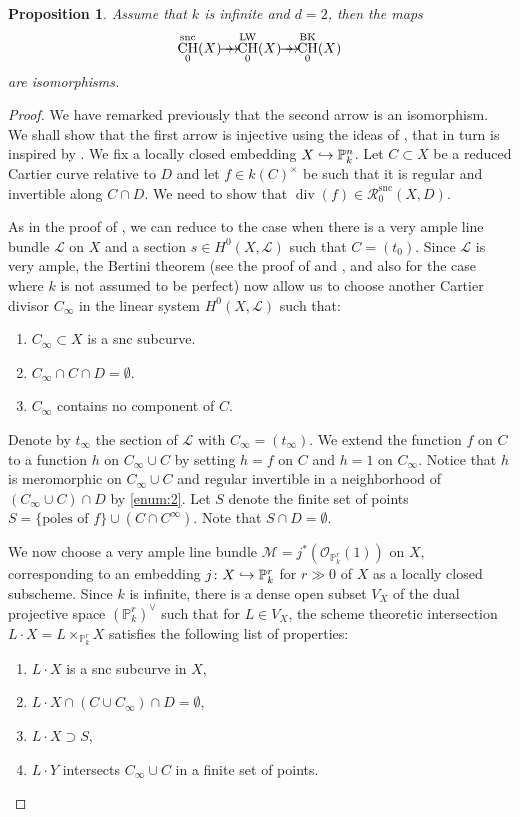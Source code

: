 \documentclass[JEP,XML,SOM,Unicode,published]{cedram}
\let\mathcal\mathscr
\def\hto{\mathrel{\lhook\joinrel\to}}
\newcommand{\onto}{\mathchoice{\to\hspace*{-5mm}\to}{\hspace*{-.5mm}\to\hspace*{-2.85mm}\to\hspace*{-.5mm}}{\to\hspace*{-3mm}\to}{\to\hspace*{-3mm}\to}}
\let\surj\onto
\let\inj\hto
\newcommand{\snc}{\mathrm{snc}}
\newcommand{\BK}{\mathrm{BK}}
\newcommand{\LW}{\mathrm{LW}}
\newtheorem{prop}[thm]{Proposition}
\theoremstyle{definition}
\newcommand{\sL}{{\mathcal L}}
\newcommand{\sM}{{\mathcal M}}
\newcommand{\sO}{{\mathcal O}}\let\cO\sO
\newcommand{\sR}{{\mathcal R}}
\renewcommand{\P}{{\mathbb P}}
\DeclareMathOperator{\CH}{CH}
\DeclareMathOperator{\divf}{div}
\begin{document}
\begin{prop}\label{prop:snc-surface}
Assume that $k$ is infinite and $d =2$, then the maps
\[
\CH^{\snc}_0(X) \surj \CH^{\LW}_0(X) \surj \CH_0^{\BK}(X)
\]
are isomorphisms.
\end{prop}
\begin{proof}
We have remarked previously that the second arrow is an isomorphism.
We shall show that the first arrow is injective using the ideas of
\cite[Lem.\,5.5]{BK}, that in turn is inspired by \cite[Lem.\,1.4]{Levine-2}.
We fix a locally closed embedding $X \inj \P^n_k$.
Let $C \subset X$ be a reduced Cartier curve relative to $D$ and
let $f \in k(C)^{\times}$ be such that it is regular and invertible along
$C \cap D$. We need to show that $\divf(f) \in \sR^{\snc}_0(X,D)$.

As in the proof of \cite[Lem.\,1.4]{Levine-2}, we can reduce to the case
when there is a very ample line bundle $\sL$ on $X$ and a section
$s \in H^0(X, \sL)$ such that $C = (t_0)$. Since $\sL$ is very ample,
the Bertini theorem (see the proof of \cite[Lem.\,1.3]{Levine-2}
and \cite[Chap.\,6]{Jou},
and also \cite{GK} for the case where $k$ is not assumed to be perfect)
now allow us to choose another Cartier divisor $C_{\infty}$ in the linear
system $H^0(X, \sL)$ such that:
\begin{enumerate}
\item\label{enum:1}
$C_{\infty} \subset X$ is a snc subcurve.
\item\label{enum:2}
$C_{\infty} \cap C \cap D = \emptyset$.
\item\label{enum:3}
$C_{\infty}$ contains no component of $C$.
\end{enumerate}

Denote by $t_{\infty}$ the section of $\sL$ with $C_\infty = (t_{\infty})$.
We extend the function $f$ on $C$ to a function $h$ on
$C_{\infty} \cup C$ by setting $h=f$ on $C$ and $h=1$ on $C_{\infty}$. Notice
that $h$ is meromorphic on $C_{\infty} \cup C$ and regular
invertible in a neighborhood of $(C_{\infty} \cup C) \cap D$ by \eqref{enum:2}. Let $S$
denote the finite set of points
$S = \{\text{poles of $f$}\} \cup (C\cap C^{\infty})$.
Note that $S\cap D = \emptyset$.

We now choose a very ample line bundle $\sM = j^*(\sO_{\P^r_k}(1))$ on $X$,
corresponding to an embedding $j\colon X \inj \P^r_k$ for $r \gg 0$ of $X$ as
a locally closed subscheme. Since $k$ is infinite, there is a dense open
subset $V_X$ of the dual projective space $(\P_k^r)^\vee$ such that for
$L \in V_X$, the scheme theoretic intersection $L\cdot X = L\times_{\P^r_k} X$
satisfies the following list of properties:
\begin{enumerate}\renewcommand{\theenumi}{\alph{enumi}}
\item\label{enum:a} $L\cdot X$ is a snc subcurve in $X$,
\item\label{enum:b} $L\cdot X \cap (C\cup C_\infty) \cap D = \emptyset$,
\item\label{enum:c} $L\cdot X\supset S$,
\item\label{enum:d} $L\cdot Y$ intersects $C_{\infty} \cup C$ in a finite set of points.
\end{enumerate}


\end{proof}
\end{document}
